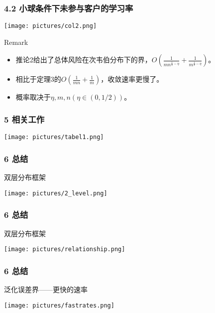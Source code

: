 \documentclass{beamer}
\begin{document}
\begin{frame}
    \frametitle{4.2 小球条件下未参与客户的学习率}
    \begin{center}
        \texttt{[image: pictures/col2.png]}
    \end{center}
    \pause
    \begin{alertblock}{Remark}
        \begin{itemize}
            \item 推论2给出了总体风险在次韦伯分布下的界，$O(\frac{1}{mn^{\frac{1}{2}-\eta}}+\frac{1}{m^{\frac{1}{2}-\eta}})$。
            \pause
            \item 相比于定理3的$O(\frac{1}{mn}+\frac{1}{m})$，收敛速率更慢了。
            \pause
            \item 概率取决于$\eta,m,n(\eta \in (0,1/2))$。
        \end{itemize}
    \end{alertblock}
\end{frame}
\begin{frame}
    \frametitle{5 相关工作}
    \begin{center}
        \texttt{[image: pictures/tabel1.png]}
    \end{center}
\end{frame}
\begin{frame}
    \frametitle{6 总结}
    \begin{exampleblock}{双层分布框架}
        \begin{center}
            \texttt{[image: pictures/2\_level.png]}
        \end{center}
    \end{exampleblock}
\end{frame}
\begin{frame}
    \frametitle{6 总结}
    \begin{exampleblock}{双层分布框架}
        \begin{center}
            \texttt{[image: pictures/relationship.png]}
        \end{center}
    \end{exampleblock}
\end{frame}
\begin{frame}
    \frametitle{6 总结}
    \begin{exampleblock}{泛化误差界——更快的速率}
        \begin{center}
            \texttt{[image: pictures/fastrates.png]}
        \end{center}
    \end{exampleblock}
\end{frame}
\end{document}
